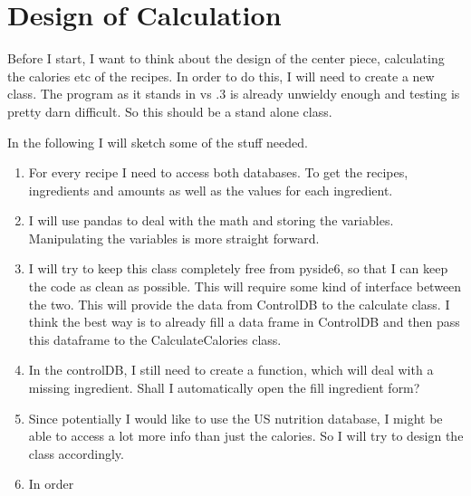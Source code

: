 \documentclass[12pt]{article}
\begin{document}
\section{Design of Calculation}
Before I start, I want to think about the design of the center piece, calculating the calories etc of the recipes. In order to do this, I will need to create a new class. The program as it stands in vs .3 is already unwieldy enough and testing is pretty darn difficult. So this should be a stand alone class.

In the following I will sketch some of the stuff needed.
\begin{enumerate}
\item  For every recipe I need to access both databases. To get the recipes, ingredients and amounts as well as 
the values for each ingredient.
\item I will use pandas to deal with the math and storing the variables. Manipulating the variables is more straight forward.
\item I will try to keep this class completely free from pyside6, so that I can keep the code as clean as possible. This will require some kind of interface between the two. This will provide the data from ControlDB to the calculate class. I think the best way is to already fill a data frame in ControlDB and then pass this dataframe to the CalculateCalories class.
\item In the controlDB, I still need to create a function, which will deal with a missing ingredient. Shall I automatically open the fill ingredient form? 
\item Since potentially I would like to use the US nutrition database, I might be able to access a lot more info than just the calories. So I will try to design the class accordingly.
\item In order 


\end{enumerate}
\end{document}
